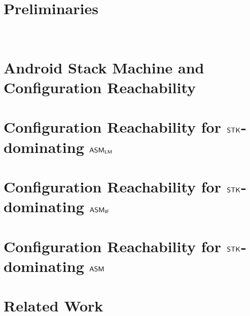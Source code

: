 \documentclass[preprint,12pt]{elsarticle}
\begin{document}
 





\section{Preliminaries}~\label{sec:prel}



\section{Android Stack Machine and Configuration Reachability} \label{sec:amass}







\section{Configuration Reachability for $\mathsf{STK}$-dominating $\textsf{ASM}_\textsf{LM}$} \label{sec:reach-lmamass}


\section{Configuration Reachability for $\mathsf{STK}$-dominating $\textsf{ASM}_\textsf{IF}$}\label{sec:reach-ifamass}



\section{Configuration Reachability for $\mathsf{STK}$-dominating $\textsf{ASM}$}\label{sec:reach-amass}






\section{Related Work}
%

\end{document}
